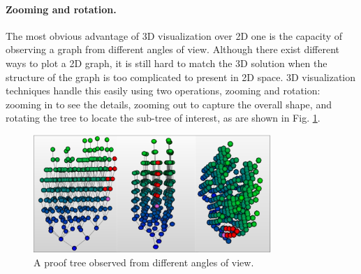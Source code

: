 \documentclass[runningheads]{llncs}
\begin{document}
\paragraph{\bf Zooming and rotation.}
The most obvious advantage of 3D visualization over 2D one is the capacity of observing a graph from different angles of view. Although there exist different ways to plot a 2D graph, it is still hard to match the 3D solution when the structure of the graph is too complicated to present in 2D space. 3D visualization techniques handle this easily using two operations, zooming and rotation: zooming in to see the details, zooming out to capture the overall shape, and rotating the tree to locate the sub-tree of interest, as are shown in Fig. \ref{fig:prooftree_angles}.
 
\begin{figure}[h]
\centering
\includegraphics[width=9cm]{./phi_prooftreegraph_angles.png}
\caption{A proof tree observed from different angles of view.}
\label{fig:prooftree_angles}
\end{figure}
 
\end{document}
